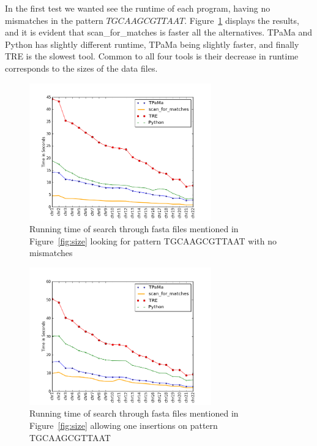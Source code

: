 In the first test we wanted see the runtime of each program, having no mismatches in the pattern $TGCAAGCGTTAAT$. Figure~\ref{fig:0miss} displays the results, and it is evident that scan\_for\_matches is faster all the alternatives. TPaMa and Python has slightly different runtime, TPaMa being slightly faster, and finally TRE is the slowest tool. Common to all four tools is their decrease in runtime corresponds to the sizes of the data files.

\begin{figure}[h!]
\centering
\includegraphics[width=0.7\textwidth]{Benchmarking/0miss.png}
\caption{Running time of search through fasta files mentioned in Figure~\ref{fig:size} looking for pattern TGCAAGCGTTAAT with no mismatches}
\label{fig:0miss}
\end{figure}


\begin{figure}[h!]
\centering
\includegraphics[width=0.7\textwidth]{Benchmarking/1ins.png}
\caption{Running time of search through fasta files mentioned in Figure~\ref{fig:size} allowing one insertions on pattern TGCAAGCGTTAAT}
\label{fig:ins1}
\end{figure}

